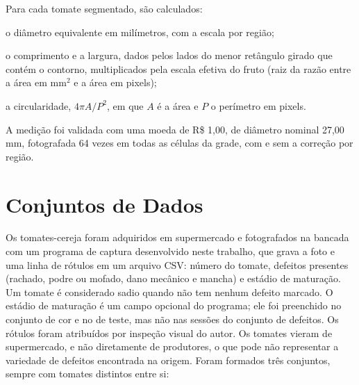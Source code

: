 Para cada tomate segmentado, são calculados:
\begin{alineas}
	\item o diâmetro equivalente em milímetros, com a escala por região;
	\item o comprimento e a largura, dados pelos lados do menor retângulo girado que contém o contorno, multiplicados pela escala efetiva do fruto (raiz da razão entre a área em mm$^2$ e a área em pixels);
	\item a circularidade, $4\pi A/P^2$, em que $A$ é a área e $P$ o perímetro em pixels.
\end{alineas}

A medição foi validada com uma moeda de R\$ 1,00, de diâmetro nominal 27,00 mm, fotografada 64 vezes em todas as células da grade, com e sem a correção por região.

\section{Conjuntos de Dados}

Os tomates-cereja foram adquiridos em supermercado e fotografados na bancada com um programa de captura desenvolvido neste trabalho, que grava a foto e uma linha de rótulos em um arquivo CSV: número do tomate, defeitos presentes (rachado, podre ou mofado, dano mecânico e mancha) e estádio de maturação. Um tomate é considerado sadio quando não tem nenhum defeito marcado. O estádio de maturação é um campo opcional do programa; ele foi preenchido no conjunto de cor e no de teste, mas não nas sessões do conjunto de defeitos. Os rótulos foram atribuídos por inspeção visual do autor. Os tomates vieram de supermercado, e não diretamente de produtores, o que pode não representar a variedade de defeitos encontrada na origem. Foram formados três conjuntos, sempre com tomates distintos entre si:

